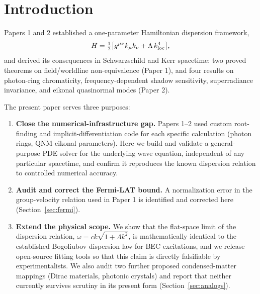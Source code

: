 \documentclass[12pt,a4paper]{article}
\begin{document}
\newpage\tableofcontents\newpage

\section{Introduction}

Papers 1 and 2 established a one-parameter Hamiltonian dispersion
framework,
\begin{equation}
  H = \tfrac{1}{2}\bigl[g^{\mu\nu}k_\mu k_\nu + \Lambda\,k_{\rm loc}^4\bigr],
\end{equation}
and derived its consequences in Schwarzschild and Kerr spacetime: two
proved theorems on field/worldline non-equivalence (Paper 1), and four
results on photon-ring chromaticity, frequency-dependent shadow
sensitivity, superradiance invariance, and eikonal quasinormal modes
(Paper 2).

The present paper serves three purposes:

\begin{enumerate}
  \item \textbf{Close the numerical-infrastructure gap.} Papers 1--2
    used custom root-finding and implicit-differentiation code for each
    specific calculation (photon rings, QNM eikonal parameters). Here we
    build and validate a general-purpose PDE solver for the underlying
    wave equation, independent of any particular spacetime, and confirm
    it reproduces the known dispersion relation to controlled numerical
    accuracy.

  \item \textbf{Audit and correct the Fermi-LAT bound.} A normalization
    error in the group-velocity relation used in Paper 1 is identified
    and corrected here (Section~\ref{sec:fermi}).

  \item \textbf{Extend the physical scope.} We show that the flat-space
    limit of the dispersion relation, $\omega=ck\sqrt{1+\Lambda k^2}$,
    is mathematically identical to the established Bogoliubov dispersion
    law for BEC excitations, and we release open-source fitting tools so
    that this claim is directly falsifiable by experimentalists. We also
    audit two further proposed condensed-matter mappings (Dirac
    materials, photonic crystals) and report that neither currently
    survives scrutiny in its present form (Section~\ref{sec:analogs}).
\end{enumerate}
\end{document}
